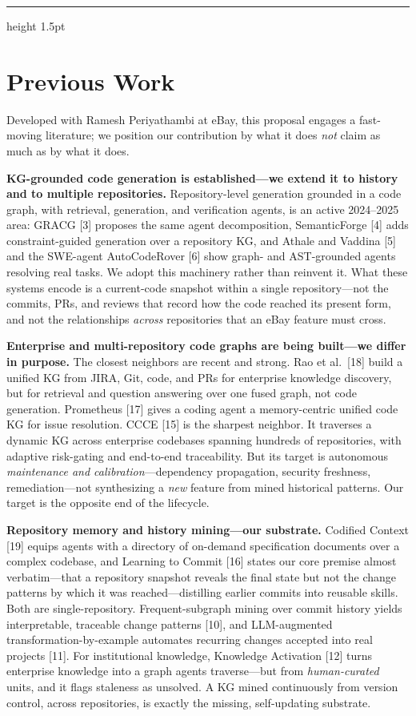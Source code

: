 \documentclass[11pt, letterpaper]{article}
\newcommand{\ehr}{{\color{gray!60}\hrule height 1.5pt}}
\begin{document}
\ehr

\section*{Previous Work}
\label{sec:previous}

Developed with Ramesh Periyathambi at eBay, this proposal engages a fast-moving literature; we position our contribution by what it does \emph{not} claim as much as by what it does.

\textbf{KG-grounded code generation is established---we extend it to history and to multiple repositories.} Repository-level generation grounded in a code graph, with retrieval, generation, and verification agents, is an active 2024--2025 area: GRACG [3] proposes the same agent decomposition, SemanticForge [4] adds constraint-guided generation over a repository KG, and Athale and Vaddina [5] and the SWE-agent AutoCodeRover [6] show graph- and AST-grounded agents resolving real tasks. We adopt this machinery rather than reinvent it. What these systems encode is a current-code snapshot within a single repository---not the commits, PRs, and reviews that record how the code reached its present form, and not the relationships \emph{across} repositories that an eBay feature must cross.

\textbf{Enterprise and multi-repository code graphs are being built---we differ in purpose.} The closest neighbors are recent and strong. Rao et al.\ [18] build a unified KG from JIRA, Git, code, and PRs for enterprise knowledge discovery, but for retrieval and question answering over one fused graph, not code generation. Prometheus [17] gives a coding agent a memory-centric unified code KG for issue resolution. CCCE [15] is the sharpest neighbor. It traverses a dynamic KG across enterprise codebases spanning hundreds of repositories, with adaptive risk-gating and end-to-end traceability. But its target is autonomous \emph{maintenance and calibration}---dependency propagation, security freshness, remediation---not synthesizing a \emph{new} feature from mined historical patterns. Our target is the opposite end of the lifecycle.

\textbf{Repository memory and history mining---our substrate.} Codified Context [19] equips agents with a directory of on-demand specification documents over a complex codebase, and Learning to Commit [16] states our core premise almost verbatim---that a repository snapshot reveals the final state but not the change patterns by which it was reached---distilling earlier commits into reusable skills. Both are single-repository. Frequent-subgraph mining over commit history yields interpretable, traceable change patterns [10], and LLM-augmented transformation-by-example automates recurring changes accepted into real projects [11]. For institutional knowledge, Knowledge Activation [12] turns enterprise knowledge into a graph agents traverse---but from \emph{human-curated} units, and it flags staleness as unsolved. A KG mined continuously from version control, across repositories, is exactly the missing, self-updating substrate.
\end{document}
